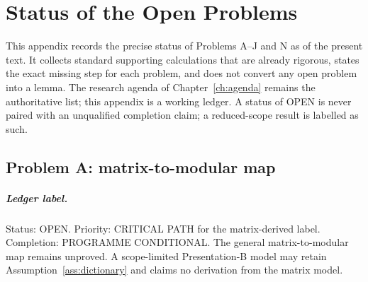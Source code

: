 \chapter{Status of the Open Problems}
\label{app:status}

This appendix records the precise status of Problems A--J and N as of the present text.
It collects standard supporting calculations that are already rigorous, states
the exact missing step for each problem, and does not convert any open problem
into a lemma. The research agenda of Chapter~\ref{ch:agenda} remains the
authoritative list; this appendix is a working ledger. A status of OPEN is
never paired with an unqualified completion claim; a reduced-scope result is
labelled as such.

\section{Problem A: matrix-to-modular map}
\label{sec:status-A}

\paragraph{Ledger label.}
Status: OPEN. Priority: CRITICAL PATH for the matrix-derived label.
Completion: PROGRAMME CONDITIONAL. The general matrix-to-modular map
remains unproved. A scope-limited Presentation-B model may retain
Assumption~\ref{ass:dictionary} and claims no derivation from the
matrix model.

